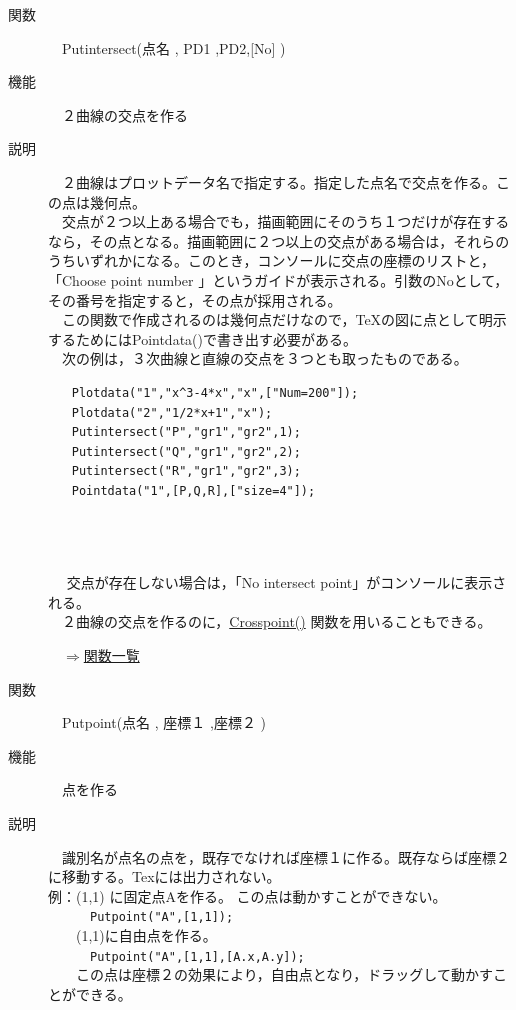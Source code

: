\documentclass[papersize,a4paper,12pt,uplatex]{jsarticle}
\begin{document}
\begin{description}
\hypertarget{putintersect}{}
\item[関数]　Putintersect(点名 , PD1 ,PD2,[No] )
\item[機能]　２曲線の交点を作る
\item[説明]　２曲線はプロットデータ名で指定する。指定した点名で交点を作る。この点は幾何点。\\
　交点が２つ以上ある場合でも，描画範囲にそのうち１つだけが存在するなら，その点となる。描画範囲に２つ以上の交点がある場合は，それらのうちいずれかになる。このとき，コンソールに交点の座標のリストと，「Choose point number 」というガイドが表示される。引数のNoとして，その番号を指定すると，その点が採用される。\\
　この関数で作成されるのは幾何点だけなので，\TeX の図に点として明示するためにはPointdata()で書き出す必要がある。\\
　次の例は，３次曲線と直線の交点を３つとも取ったものである。
\begin{verbatim}
　　Plotdata("1","x^3-4*x","x",["Num=200"]);
　　Plotdata("2","1/2*x+1","x");
　　Putintersect("P","gr1","gr2",1);
　　Putintersect("Q","gr1","gr2",2);
　　Putintersect("R","gr1","gr2",3);
　　Pointdata("1",[P,Q,R],["size=4"]);
\end{verbatim}
　\\
 　　　　　　　　　　\\
 　\\
　 交点が存在しない場合は，「No intersect point」がコンソールに表示される。\\
　２曲線の交点を作るのに，\hyperlink{crosspoint}{Crosspoint()} 関数を用いることもできる。\\
\begin{flushright}　\hyperlink{functionlist}{$\Rightarrow$関数一覧}\end{flushright}


\hypertarget{putpoint}{}
\item[関数]　Putpoint(点名 , 座標１ ,座標２ )
\item[機能]　点を作る
\item[説明]　識別名が点名の点を，既存でなければ座標１に作る。既存ならば座標２に移動する。Texには出力されない。\\

例：(1,1) に固定点Aを作る。 この点は動かすことができない。\\
　　　\verb|Putpoint("A",[1,1]);|\\
　　(1,1)に自由点を作る。\\
　　　\verb|Putpoint("A",[1,1],[A.x,A.y]);|\\
　　この点は座標２の効果により，自由点となり，ドラッグして動かすことができる。\\


\end{description}
\end{document}
